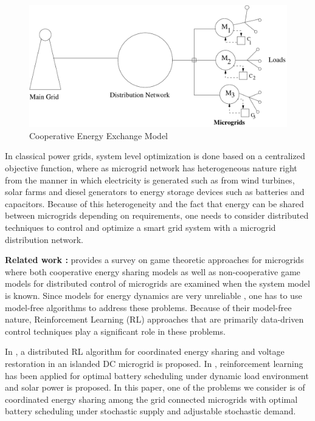 \begin{figure}[thpb]
      \centering
      \includegraphics[scale=0.31]{powergrid2.pdf}
      \caption{Cooperative Energy Exchange Model}
      \label{gridmodel}
\end{figure}

In classical power grids, system level optimization is done based on a centralized
objective function, where as 
microgrid network has heterogeneous nature right from the manner in which electricity
is generated such as from wind turbines, solar farms and diesel generators
to energy storage devices such as batteries and capacitors.
 Because of this heterogeneity and the fact that energy can be shared between microgrids depending
on requirements, one needs to consider distributed techniques 
 to control and optimize a smart grid system
with a microgrid distribution network.

\textbf{Related work :} \cite{saad2012game} provides a survey on game theoretic approaches for microgrids where both cooperative energy sharing models as well as non-cooperative game models for distributed control of microgrids are examined when the system model is known. Since  models for energy dynamics are very unreliable \cite{zamora2010controls}, one has to use model-free algorithms to address these problems.  Because of their model-free nature, Reinforcement Learning (RL) \cite{sutton1998reinforcement} approaches that are primarily data-driven control techniques play a significant role in these problems.

In \cite{zifadistributed}, a distributed RL algorithm for coordinated energy sharing and voltage restoration in an islanded DC microgrid is proposed. In \cite{leo2014reinforcement}, reinforcement learning has been applied for optimal battery scheduling under  dynamic load environment and solar power is proposed. In this paper, one of the problems we  consider is of coordinated energy sharing among the grid connected microgrids with optimal battery scheduling under stochastic supply and adjustable stochastic demand. %

